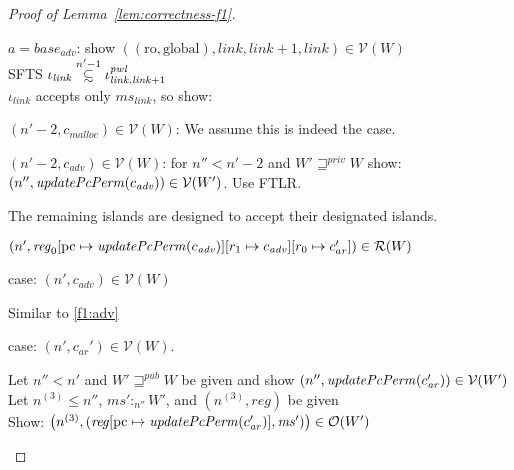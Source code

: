 \documentclass[a4paper]{article}
\newcommand{\update}[2]{[#1 \mapsto #2]}
\newcommand\subsetsim{\mathrel{\ooalign{\raise.2ex\hbox{$\subset$}\cr
      \hidewidth\lower.8ex\hbox{\scalebox{0.9}{$\sim$}}\hidewidth\cr}}}
\newcommand{\nsubsim}[1][n]{\stackrel{\tiny{#1}}{\subsetsim}}
\newcommand{\var}[1]{\mathit{#1}}
\newcommand{\hs}{\var{ms}}
\newcommand{\ms}{\hs}
\newcommand{\pcreg}{\mathrm{pc}}
\newcommand{\start}{\var{base}}
\newcommand{\reg}{\var{reg}}
\newcommand{\heap}{\var{mem}}
\newcommand{\adv}{\var{adv}}
\newcommand{\link}{\var{link}}
\newcommand{\pwl}{\var{pwl}}
\newcommand{\plainfun}[2]{
  \ifthenelse{\equal{#2}{}}
  {\mathit{#1}}
  {\mathit{#1}(#2)}
}
\newcommand{\updatePcPerm}[1]{\plainfun{updatePcPerm}{#1}}
\newcommand{\futurewk}{\mathbin{\sqsupseteq}^{\var{pub}}}
\newcommand{\futurestr}{\mathbin{\sqsupseteq}^{\var{priv}}}
\newcommand{\heapSat}[3][\heap]{#1 :_{#2} #3}
\newcommand{\codelabel}[1]{\mathit{#1}}
\newcommand{\malloc}{\codelabel{malloc}}
\newcommand{\asmType}{\plaindom{AsmType}}
\newcommand{\plaindom}[1]{\mathrm{#1}}
\newcommand{\intr}[2]{\mathcal{#1}}
\newcommand{\valueintr}[1]{\intr{V}{#1}}
\newcommand{\regintr}[1]{\intr{R}{#1}}
\newcommand{\stdvr}{\valueintr{\asmType}}
\newcommand{\stdrr}{\regintr{\asmType}}
\newcommand{\observations}{\mathcal{O}}
\newcommand{\npair}[2][n]{\left(#1,#2 \right)}
\newcommand{\plainperm}[1]{\mathrm{#1}}
\newcommand{\readonly}{\plainperm{ro}}
\newcommand{\glob}{\plainperm{global}}
\begin{document}
\begin{proof}[Proof of Lemma~\ref{lem:correctness-f1}]
\begin{enumproof}[resume]
\begin{enumproof}
\begin{enumproof}
\begin{enumproof}
                      \item $a = \start_\adv$: show $((\readonly,\glob),\link,\link+1,\link) \in \stdvr(W)$\\
                        SFTS $\iota_{\link} \nsubsim[n'-1] \iota^\pwl_{\link,\link+1}$\\
                        $\iota_{\link}$ accepts only $\ms_\link$, so show:
                        \begin{enumproof}
                        \item $\npair[n'-2]{c_\malloc} \in \stdvr(W)$: We assume this is indeed the case.
                        \item $\npair[n'-2]{c_\adv} \in \stdvr(W)$: for $n'' < n'-2$ and $W' \futurestr W$ show: \\$\npair[n'']{\updatePcPerm{c_\adv}} \in \stdvr(W')$. Use FTLR. \label{f1:adv}
                        \end{enumproof}
                      \end{enumproof}
                    \item The remaining islands are designed to accept their designated islands.
                    \end{enumproof}
                  \end{enumproof}
                \item $\npair[n']{\reg_0\update{\pcreg}{\updatePcPerm{c_{\var{adv}}}}\update{r_1}{c_{\var{adv}}}\update{r_0}{c_{ar}'}} \in \stdrr(W)$
                  \begin{enumproof}
                  \item case: $\npair[n']{c_{\var{adv}}} \in \stdvr(W)$
                    \begin{enumproof}
                    \item Similar to \ref{f1:adv}
                    \end{enumproof}
                  \item case: $\npair[n']{c_{\var{ar}}'} \in \stdvr(W)$.
                    \begin{enumproof}
                    \item Let $n'' < n'$ and $W' \futurewk W$ be given and show $\npair[n'']{\updatePcPerm{c_{\var{ar}}'}} \in \stdvr(W')$\\
                      Let $n^{(3)} \leq n''$, $\heapSat[\ms']{n''}{W'}$, and $\npair[n^{(3)}]{\reg}$ be given\\
                      Show: $\npair[n^{(3)}]{(\reg\update{\pcreg}{\updatePcPerm{c_{\var{ar}}'}},\ms')} \in \observations(W')$\\

\end{enumproof}
\end{enumproof}
\end{enumproof}
\end{proof}
\end{document}
